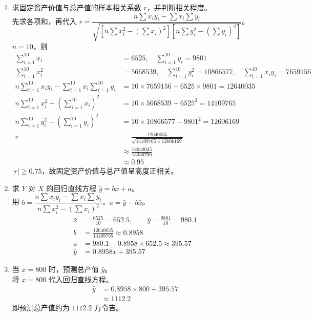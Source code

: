 \documentclass[12pt,a4paper]{exam-zh}
\begin{document}
\begin{solution}
    \begin{enumerate}[label=(\alph*)]
        \item 求固定资产价值与总产值的样本相关系数 $r$，并判断相关程度。\\
        先求各项和，再代入 $r=\dfrac{n\sum x_iy_i-\sum x_i\sum y_i}{\sqrt{\left[n\sum x_i^2-\left(\sum x_i\right)^2\right]\left[n\sum y_i^2-\left(\sum y_i\right)^2\right]}}$。\\
        $n=10$，则
        \begin{align*}
            \sum\limits_{i=1}^{10}x_i &= 6525, \quad \sum\limits_{i=1}^{10}y_i=9801 \\
            \sum\limits_{i=1}^{10}x_i^2 &= 5668539, \quad \sum\limits_{i=1}^{10}y_i^2=10866577, \quad \sum\limits_{i=1}^{10}x_iy_i=7659156 \\
            n\sum\limits_{i=1}^{10}x_iy_i-\sum\limits_{i=1}^{10}x_i\sum\limits_{i=1}^{10}y_i &= 10\times 7659156-6525\times 9801=12640035 \\
            n\sum\limits_{i=1}^{10}x_i^2-\left(\sum\limits_{i=1}^{10}x_i\right)^2 &= 10\times 5668539-6525^2=14109765 \\
            n\sum\limits_{i=1}^{10}y_i^2-\left(\sum\limits_{i=1}^{10}y_i\right)^2 &= 10\times 10866577-9801^2=12606169 \\
            r &= \frac{12640035}{\sqrt{14109765\times 12606169}} \\
            &\approx \frac{12640035}{13336796} \\
            &\approx 0.95
        \end{align*}
        $|r|\ge 0.75$，故固定资产价值与总产值呈高度正相关。

        \item 求 $Y$ 对 $X$ 的回归直线方程 $\hat{y}=bx+a$。\\
        用 $b=\dfrac{n\sum x_iy_i-\sum x_i\sum y_i}{n\sum x_i^2-\left(\sum x_i\right)^2}$，$a=\bar{y}-b\bar{x}$。
        \begin{align*}
            \bar{x} &= \frac{6525}{10}=652.5, \qquad \bar{y}=\frac{9801}{10}=980.1 \\
            b &= \frac{12640035}{14109765}\approx 0.8958 \\
            a &= 980.1-0.8958\times 652.5\approx 395.57 \\
            \hat{y} &= 0.8958x+395.57
        \end{align*}

        \item 当 $x=800$ 时，预测总产值 $\hat{y}$。\\
        将 $x=800$ 代入回归直线方程。
        \begin{align*}
            \hat{y} &= 0.8958\times 800+395.57 \\
            &\approx 1112.2
        \end{align*}
        即预测总产值约为 $1112.2$ 万令吉。
    \end{enumerate}
\end{solution}
\end{document}
